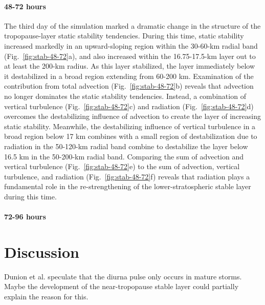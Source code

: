 \documentclass{ametsoc}
\begin{document}
\paragraph{48-72 hours}
The third day of the simulation marked a dramatic change in the structure of the tropopause-layer static stability tendencies. During this time, static stability increased markedly in an upward-sloping region within the 30-60-km radial band (Fig.~\ref{fig:stab-48-72}a), and also increased within the 16.75-17.5-km layer out to at least the 200-km radius.
As this layer stabilized, the layer immediately below it destabilized in a broad region extending from 60-200 km.
Examination of the contribution from total advection (Fig.~\ref{fig:stab-48-72}b) reveals that advection no longer dominates the static stability tendencies.
Instead, a combination of vertical turbulence (Fig.~\ref{fig:stab-48-72}c) and radiation (Fig.~\ref{fig:stab-48-72}d) overcomes the destabilizing influence of advection to create the layer of increasing static stability.
Meanwhile, the destabilizing influence of vertical turbulence in a broad region below 17 km combines with a small region of destabilization due to radiation in the 50-120-km radial band combine to destabilize the layer below 16.5 km in the 50-200-km radial band.
Comparing the sum of advection and vertical turbulence (Fig.~\ref{fig:stab-48-72}e) to the sum of advection, vertical turbulence, and radiation (Fig.~\ref{fig:stab-48-72}f) reveals that radiation plays a fundamental role in the re-strengthening of the lower-stratospheric stable layer during this time.

\paragraph{72-96 hours}

  \section{Discussion}

Dunion et al. speculate that the diurna pulse only occurs in mature storms. Maybe the development of the near-tropopause stable layer could partially explain the reason for this.


\end{document}
